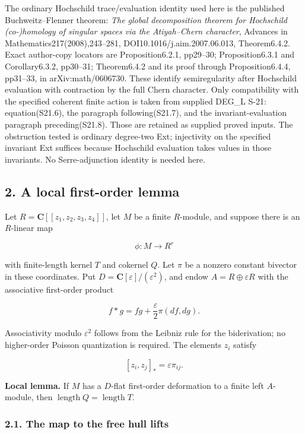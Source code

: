 The ordinary Hochschild trace/evaluation identity used here is the
published Buchweitz--Flenner theorem: \emph{The global decomposition
theorem for Hochschild (co-)homology of singular spaces via the
Atiyah--Chern character}, Advances in Mathematics217(2008),243--281,
DOI10.1016/j.aim.2007.06.013, Theorem6.4.2. Exact author-copy locators
are Proposition6.2.1, pp29--30; Proposition6.3.1 and Corollary6.3.2,
pp30--31; Theorem6.4.2 and its proof through Proposition6.4.4, pp31--33,
in arXiv:math/0606730. These identify semiregularity after Hochschild
evaluation with contraction by the full Chern character. Only
compatibility with the specified coherent finite action is taken from
supplied DEG\_L S-21: equation(S21.6), the paragraph following(S21.7),
and the invariant-evaluation paragraph preceding(S21.8). Those are
retained as supplied proved inputs. The obstruction tested is ordinary
degree-two Ext; injectivity on the specified invariant Ext suffices
because Hochschild evaluation takes values in those invariants. No
Serre-adjunction identity is needed here.

\subsection{2. A local first-order
lemma}\label{SF-E819-a-local-first-order-lemma}

Let \(R=\mathbf C[[z_1,z_2,z_3,z_4]]\), let \(M\) be a finite
\(R\)-module, and suppose there is an \(R\)-linear map

\[
 \phi:M\longrightarrow R^r
\]

with finite-length kernel \(T\) and cokernel \(Q\). Let \(\pi\) be a
nonzero constant bivector in these coordinates. Put
\(D=\mathbf C[\varepsilon]/(\varepsilon^2)\), and endow
\(A=R\oplus\varepsilon R\) with the associative first-order product

\[
 f*g=fg+\frac{\varepsilon}{2}\pi(df,dg).
 \tag{E819.3}
\]

Associativity modulo \(\varepsilon^2\) follows from the Leibniz rule for
the biderivation; no higher-order Poisson quantization is required. The
elements \(z_i\) satisfy

\[
 [z_i,z_j]_* =\varepsilon\pi_{ij}.
 \tag{E819.4}
\]

\textbf{Local lemma.} If \(M\) has a \(D\)-flat first-order deformation
to a finite left \(A\)-module, then
\(\operatorname{length}Q=\operatorname{length}T\).

\subsubsection{2.1. The map to the free hull
lifts}\label{SF-E819-the-map-to-the-free-hull-lifts}

